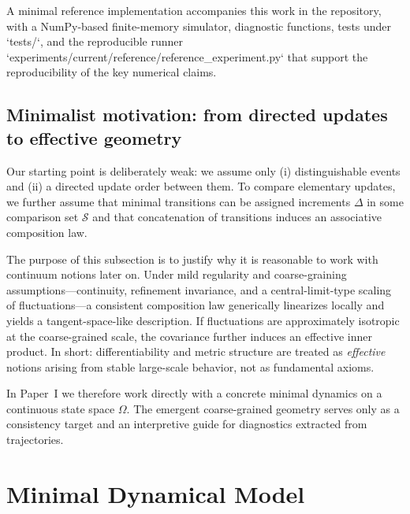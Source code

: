\documentclass[reprint,amsmath,amssymb,aps,prd,nofootinbib,floatfix]{revtex4-2}
\begin{document}
A minimal reference implementation accompanies this work in the repository, with a NumPy-based finite-memory simulator, diagnostic functions, tests under `tests/`, and the reproducible runner `experiments/current/reference/reference_experiment.py` that support the reproducibility of the key numerical claims.

\subsection{Minimalist motivation: from directed updates to effective geometry}\label{sec:minimalist_motivation}

Our starting point is deliberately weak: we assume only (i) distinguishable events and (ii) a directed update order between them.
To compare elementary updates, we further assume that minimal transitions can be assigned increments $\Delta$ in some comparison set $\mathcal{S}$ and that concatenation of transitions induces an associative composition law.

The purpose of this subsection is to justify why it is reasonable to work with continuum notions later on.
Under mild regularity and coarse-graining assumptions---continuity, refinement invariance, and a central-limit-type scaling of fluctuations---a consistent composition law generically linearizes locally and yields a tangent-space-like description.
If fluctuations are approximately isotropic at the coarse-grained scale, the covariance further induces an effective inner product.
In short: differentiability and metric structure are treated as \emph{effective} notions arising from stable large-scale behavior, not as fundamental axioms.

In Paper~I we therefore work directly with a concrete minimal dynamics on a continuous state space $\Omega$.
The emergent coarse-grained geometry serves only as a consistency target and an interpretive guide for diagnostics extracted from trajectories.


\section{Minimal Dynamical Model}\label{sec:MinDynModel}
\end{document}
